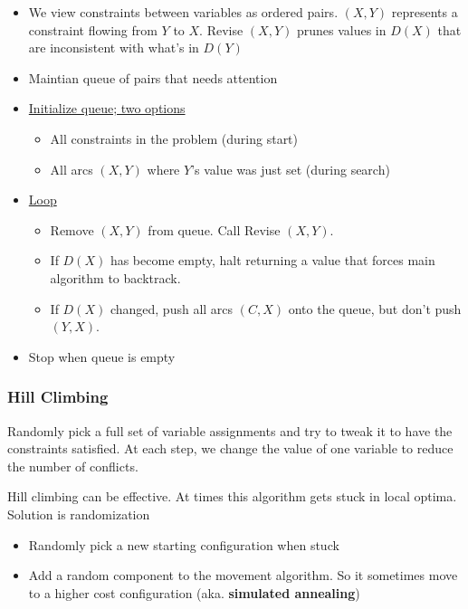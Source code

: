       \begin{itemize}
        \item We view constraints between variables as ordered pairs.
        $ \left( X, Y \right) $ represents a constraint flowing from $ Y $
        to $ X $. Revise $ \left( X, Y \right) $ prunes values in
        $ D\left( X \right) $ that are inconsistent with what's in
        $ D\left( Y \right) $

        \item Maintian queue of pairs that needs attention
        \item \ul{Initialize queue; two options}
        \begin{itemize}
          \item All constraints in the problem (during start)
          \item All arcs $ (X,Y) $ where $ Y $'s value was just set (during
          search)
        \end{itemize}

        \item \ul{Loop}
        \begin{itemize}
          \item Remove $ (X,Y) $ from queue. Call Revise $ (X,Y) $.
          \item If $ D(X) $ has become empty, halt returning a value
          that forces main algorithm to backtrack.
          \item If $ D(X) $ changed, push all arcs $ (C,X) $ onto the queue,
          but don't push $ (Y,X) $.
        \end{itemize}

        \item Stop when queue is empty
      \end{itemize}

    \subsubsection{Hill Climbing}

      Randomly pick a full set of variable assignments and try to tweak it
      to have the constraints satisfied. At each step, we change the value
      of one variable to reduce the number of conflicts.

      Hill climbing can be effective. At times this algorithm gets stuck in
      local optima. Solution is randomization
      \begin{itemize}
        \item Randomly pick a new starting configuration when stuck
        \item Add a random component to the movement algorithm. So it sometimes
        move to a higher cost configuration (aka. \textbf{simulated annealing})
      \end{itemize}